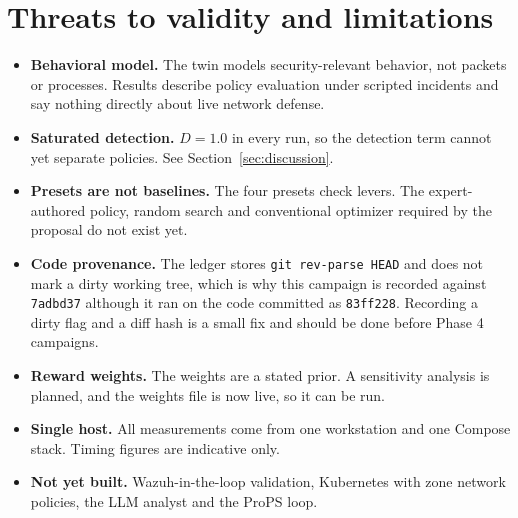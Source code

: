 \documentclass[11pt]{article}
\newcommand{\code}[1]{\texttt{\small #1}}
\begin{document}
\section{Threats to validity and limitations}
\label{sec:validity}
\begin{itemize}[leftmargin=1.4em,itemsep=2pt]
\item \textbf{Behavioral model.} The twin models security-relevant behavior, not
packets or processes. Results describe policy evaluation under scripted incidents
and say nothing directly about live network defense.
\item \textbf{Saturated detection.} $D=1.0$ in every run, so the detection term
cannot yet separate policies. See Section~\ref{sec:discussion}.
\item \textbf{Presets are not baselines.} The four presets check levers. The
expert-authored policy, random search and conventional optimizer required by the
proposal do not exist yet.
\item \textbf{Code provenance.} The ledger stores \code{git rev-parse HEAD} and does
not mark a dirty working tree, which is why this campaign is recorded against
\code{7adbd37} although it ran on the code committed as \code{83ff228}. Recording
a dirty flag and a diff hash is a small fix and should be done before Phase 4
campaigns.
\item \textbf{Reward weights.} The weights are a stated prior. A sensitivity
analysis is planned, and the weights file is now live, so it can be run.
\item \textbf{Single host.} All measurements come from one workstation and one
Compose stack. Timing figures are indicative only.
\item \textbf{Not yet built.} Wazuh-in-the-loop validation, Kubernetes with zone
network policies, the LLM analyst and the ProPS loop.
\end{itemize}

\end{document}
